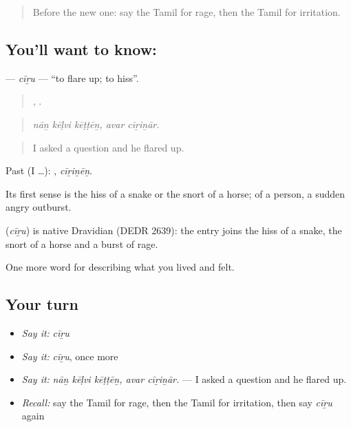 \label{lesson:TA-C453-ciru}



\begin{quote}
Before the new one: say the Tamil for rage, then the Tamil for irritation.
\end{quote}

\subsection*{You'll want to know: }
\textbf{} — \emph{cīṟu} — \textquotedblleft{}to flare up; to hiss\textquotedblright{}.

\begin{quote}
  ,  .
\end{quote}

\begin{quote}
\emph{nāṉ kēḷvi kēṭṭēṉ, avar cīṟiṉār.}
\end{quote}

\begin{quote}
I asked a question and he flared up.
\end{quote}

Past (I …): , \emph{cīṟiṉēṉ}.

Its first sense is the hiss of a snake or the snort of a horse; of a person, a sudden angry outburst.

\begin{cousinweb}
\textbf{} (\emph{cīṟu}) is native Dravidian (DEDR 2639): the entry joins the hiss of a snake, the snort of a horse and a burst of rage.
\end{cousinweb}

\begin{grammarlens}[title={What you've built}]
One more word for describing what you lived and felt.
\end{grammarlens}

\subsection*{Your turn}
\begin{itemize}
\raggedright
  \item \emph{Say it:} \emph{cīṟu}
  \item \emph{Say it:} \emph{cīṟu}, once more
  \item \emph{Say it:} \emph{nāṉ kēḷvi kēṭṭēṉ, avar cīṟiṉār.} — I asked a question and he flared up.
  \item \emph{Recall:} say the Tamil for rage, then the Tamil for irritation, then say \emph{cīṟu} again
\end{itemize}


